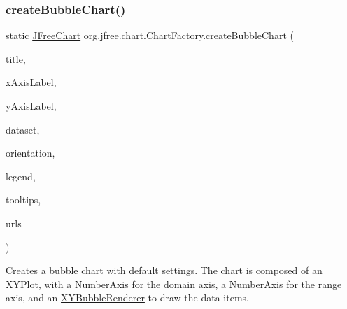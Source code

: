 \subsubsection{\texorpdfstring{create\+Bubble\+Chart()}{createBubbleChart()}\hspace{0.1cm}{\footnotesize\ttfamily [2/2]}}
{\footnotesize\ttfamily static \mbox{\hyperlink{classorg_1_1jfree_1_1chart_1_1_j_free_chart}{J\+Free\+Chart}} org.\+jfree.\+chart.\+Chart\+Factory.\+create\+Bubble\+Chart (\begin{DoxyParamCaption}\item[{String}]{title,  }\item[{String}]{x\+Axis\+Label,  }\item[{String}]{y\+Axis\+Label,  }\item[{\mbox{\hyperlink{interfaceorg_1_1jfree_1_1data_1_1xy_1_1_x_y_z_dataset}{X\+Y\+Z\+Dataset}}}]{dataset,  }\item[{\mbox{\hyperlink{classorg_1_1jfree_1_1chart_1_1plot_1_1_plot_orientation}{Plot\+Orientation}}}]{orientation,  }\item[{boolean}]{legend,  }\item[{boolean}]{tooltips,  }\item[{boolean}]{urls }\end{DoxyParamCaption})\hspace{0.3cm}{\ttfamily [static]}}

Creates a bubble chart with default settings. The chart is composed of an \mbox{\hyperlink{}{X\+Y\+Plot}}, with a \mbox{\hyperlink{}{Number\+Axis}} for the domain axis, a \mbox{\hyperlink{}{Number\+Axis}} for the range axis, and an \mbox{\hyperlink{}{X\+Y\+Bubble\+Renderer}} to draw the data items.


